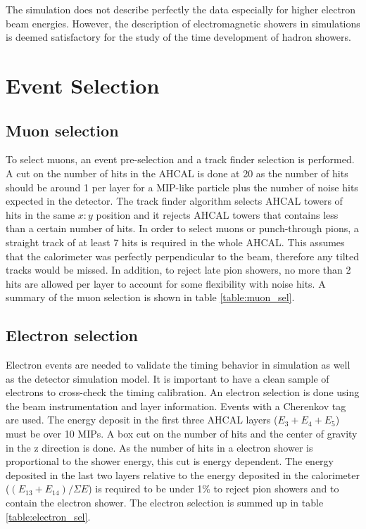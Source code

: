 \documentclass{JINST}
\begin{document}
The simulation does not describe perfectly the data especially for higher electron beam energies. However, the description of electromagnetic showers in simulations is deemed satisfactory for the study of the time development of hadron showers.

\section{Event Selection}

\subsection{Muon selection}

To select muons, an event pre-selection and a track finder \cite{Hartbrich:2016bbz} selection is performed. A cut on the number of hits in the AHCAL is done at 20 as the number of hits should be around 1 per layer for a MIP-like particle plus the number of noise hits expected in the detector. The track finder algorithm selects AHCAL towers of hits in the same $x:y$ position and it rejects AHCAL towers that contains less than a certain number of hits. In order to select muons or punch-through pions, a straight track of at least 7 hits is required in the whole AHCAL. This assumes that the calorimeter was perfectly perpendicular to the beam, therefore any tilted tracks would be missed. In addition, to reject late pion showers, no more than 2 hits are allowed per layer to account for some flexibility with noise hits. A summary of the muon selection is shown in table \ref{table:muon_sel}.

\subsection{Electron selection}

Electron events are needed to validate the timing behavior in simulation as well as the detector simulation model. It is important to have a clean sample of electrons to cross-check the timing calibration. An electron selection is done using the beam instrumentation and layer information. Events with a Cherenkov tag are used. The energy deposit in the first three AHCAL layers ($E_3+E_4+E_5$) must be over 10 MIPs. A box cut on the number of hits and the center of gravity in the z direction is done. As the number of hits in a electron shower is proportional to the shower energy, this cut is energy dependent. The energy deposited in the last two layers relative to the energy deposited in the calorimeter ($(E_{13}+E_{14})/\Sigma E$) is required to be under 1\% to reject pion showers and to contain the electron shower. The electron selection is summed up in table \ref{table:electron_sel}.
\end{document}
